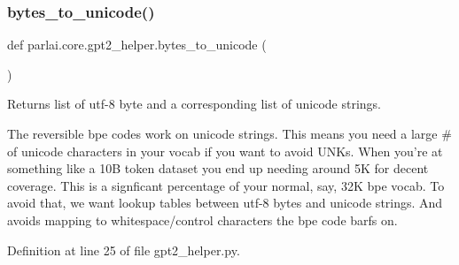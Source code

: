 \subsubsection{\texorpdfstring{bytes\+\_\+to\+\_\+unicode()}{bytes\_to\_unicode()}}
{\footnotesize\ttfamily def parlai.\+core.\+gpt2\+\_\+helper.\+bytes\+\_\+to\+\_\+unicode (\begin{DoxyParamCaption}{ }\end{DoxyParamCaption})}

\begin{DoxyVerb}Returns list of utf-8 byte and a corresponding list of unicode strings.

The reversible bpe codes work on unicode strings. This means you need a large # of
unicode characters in your vocab if you want to avoid UNKs. When you're at something
like a 10B token dataset you end up needing around 5K for decent coverage. This is a
signficant percentage of your normal, say, 32K bpe vocab. To avoid that, we want
lookup tables between utf-8 bytes and unicode strings. And avoids mapping to
whitespace/control characters the bpe code barfs on.
\end{DoxyVerb}
 

Definition at line 25 of file gpt2\+\_\+helper.\+py.


